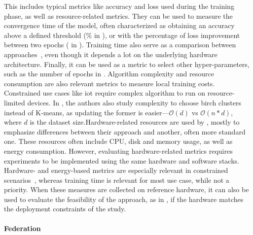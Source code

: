 This includes typical metrics like accuracy and loss used during the training phase, as well as resource-related metrics.
They can be used to measure the convergence time of the model, often characterized as obtaining an accuracy above a defined threshold (\% in \cite{chen_Networkanomalydetection_2020}), or with the percentage of loss improvement between two epochs ( in \cite{kim_CollaborativeAnomalyDetection_2020}). Training time also serve as a comparison between approaches~\cite{schneble_Attackdetectionusing_2019}, even though it depends a lot on the underlying hardware architecture. Finally, it can be used as a metric to select other hyper-parameters, such as the number of epochs in \cite{liu_BlockchainFederatedLearning_2021}.
Algorithm complexity and resource consumption are also relevant metrics to measure local training costs.
Constrained use cases like \gls{iot} require complex algorithm to run on resource-limited devices.
In \cite{pahl_AllEyesYou_2018}, the authors also study complexity to choose \gls{birch} clusters instead of K-means, as updating the former is easier---\(\mathcal{O}(d)\) vs \(\mathcal{O}(n*d)\), where \(d\) is the dataset size.Hardware-related resources are used by \cite{rathore_BlockSecIoTNetBlockchainbaseddecentralized_2019,zhao_MultiTaskNetworkAnomaly_2019}, mostly to emphasize differences between their approach and another, often more standard one.
These resources often include CPU, disk and memory usage, as well as energy consumption.
However, evaluating hardware-related metrics requires experiments to be implemented using the same hardware and software stacks.
Hardware- and energy-based metrics are especially relevant in constrained scenarios~\cite{nguyen_DIoTFederatedSelflearning_2019,schneble_Attackdetectionusing_2019}, whereas training time is relevant for most use case, while not a priority.
When these measures are collected on reference hardware, it can also be used to evaluate the feasibility of the approach, as in \cite{nguyen_DIoTFederatedSelflearning_2019}, if the hardware matches the deployment constraints of the study.

\paragraph{Federation}

